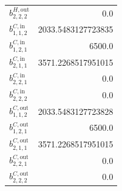 \documentclass{article}%
\begin{document}
\begin{multicols*}{3}
\begin{supertabular}{lr}
	$b_{2,2,2}^{H,\text{out}}$ & 0.0 \\%
	$b_{1,1,2}^{C,\text{in}}$ & 2033.5483127723835 \\%
	$b_{1,2,1}^{C,\text{in}}$ & 6500.0 \\%
	$b_{2,1,1}^{C,\text{in}}$ & 3571.2268517951015 \\%
	$b_{2,2,1}^{C,\text{in}}$ & 0.0 \\%
	$b_{2,2,2}^{C,\text{in}}$ & 0.0 \\%
	$b_{1,1,2}^{C,\text{out}}$ & 2033.5483127723828 \\%
	$b_{1,2,1}^{C,\text{out}}$ & 6500.0 \\%
	$b_{2,1,1}^{C,\text{out}}$ & 3571.2268517951015 \\%
	$b_{2,2,1}^{C,\text{out}}$ & 0.0 \\%
	$b_{2,2,2}^{C,\text{out}}$ & 0.0 \\%
\end{supertabular}%
\end{multicols*}%
\end{document}
